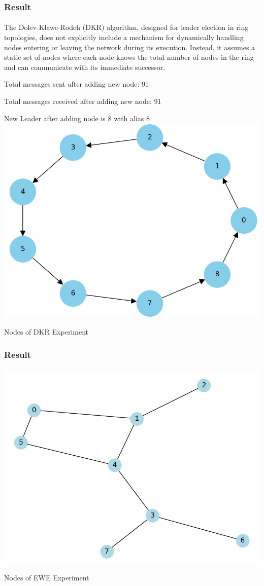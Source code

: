 \documentclass[11pt]{beamer}              %
\begin{document}
\begin{frame}
\frametitle{Result}
\framesubtitle{}
The Dolev-Klawe-Rodeh (DKR) algorithm, designed for leader election in ring topologies, does not explicitly include a mechanism for dynamically handling nodes entering or leaving the network during its execution. 
Instead, it assumes a static set of nodes where each node knows the total number of nodes in the ring and can communicate with its immediate successor. 
\item Total messages sent after adding new node: 91
\item Total messages received after adding new node: 91
\item New Leader after adding node is 8 with alias 8   
\centering
\includegraphics[scale=0.2]{figures/Screen36.jpg}
\caption{Nodes of DKR Experiment}
\label{fig:Message Complexity}

\end{frame}



\begin{frame}
\frametitle{Result}
\framesubtitle{}

    \centering
    \includegraphics[scale=0.4]{figures/Screen30.jpg}
    \caption{Nodes of EWE Experiment}
    \label{fig:Message Complexity}

\end{frame}
\end{document}
